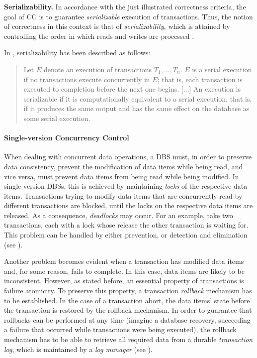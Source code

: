 \vspace{0.5em}
\noindent
{\bf Serializability.}
In accordance with the just illustrated correctness criteria, the goal of CC is to guarantee \emph{serializable} execution of transactions. Thus, the notion of correctness in this context is that of \emph{serializability}, which is attained by controlling the order in which reads and writes are processed \cite{Pap79} \cite{BG83}.

In \cite{BG81}, serializability has been described as follows:
\begin{quote}
Let $E$ denote an execution of transactions $T_1, ..., T_n$. $E$ is a serial execution if no transactions execute concurrently in $E$; that is, each transaction is executed to completion before the next one begins. [...] An execution is serializable if it is computationally equivalent to a serial execution, that is, if it produces the same output and has the same effect on the database as some serial execution.
\end{quote}

\paragraph{Single-version Concurrency Control}
When dealing with concurrent data operations, a DBS must, in order to preserve data consistency, prevent the modification of data items while being read, and vice versa, must prevent data items from being read while being modified. In single-version DBSs, this is achieved by maintaining \emph{locks} of the respective data items. Transactions trying to modify data items that are concurrently read by different transactions are blocked, until the locks on the respective data items are released. As a consequence, \emph{deadlocks} may occur. For an example, take two transactions, each with a lock whose release the other transaction is waiting for. This problem can be handled by either prevention, or detection and elimination (see \cite{BG81}).

Another problem becomes evident when a transaction has modified data items and, for some reason, fails to complete. In this case, data items are likely to be inconsistent. However, as stated before, an essential property of transactions is failure atomicity. To preserve this property, a transaction \emph{rollback} mechanism has to be established. In the case of a transaction abort, the data items' state before the transaction is restored by the rollback mechanism. In order to guarantee that rollbacks can be performed at any time (imagine a database recovery, succeeding a failure that occurred while transactions were being executed), the rollback mechanism has to be able to retrieve all required data from a durable \emph{transaction log}, which is maintained by a \emph{log manager} (see \cite[p.~493ff]{GR92}).

